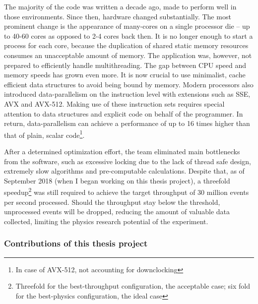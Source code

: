 \documentclass[12pt]{article}
\begin{document}
\vspace{1pc}
The majority of the code was written a decade ago, made to perform well in those environments. Since then, hardware changed substantially. The most prominent change is the appearance of many-cores on a single processor die -- up to 40-60 cores as opposed to 2-4 cores back then. It is no longer enough to start a process for each core, because the duplication of shared static memory resources consumes an unacceptable amount of memory. The application was, however, not prepared to efficiently handle multithreading. The gap between CPU speed and memory speeds has grown even more. It is now crucial to use minimalist, cache efficient data structures to avoid being bound by memory. Modern processors also introduced data-parallelism on the instruction level with extensions such as SSE, AVX and AVX-512. Making use of these instruction sets requires special attention to data structures and explicit code on behalf of the programmer. In return, data-parallelism can achieve a performance of up to 16 times higher than that of plain, scalar code\footnote{In case of AVX-512, not accounting for downclocking}.

\vspace{1pc}
After a determined optimization effort, the team eliminated main bottlenecks from the software, such as excessive locking due to the lack of thread safe design, extremely slow algorithms and pre-computable calculations. Despite that, as of September 2018 (when I began working on this thesis project), a threefold speedup\footnote{Threefold for the best-throughput configuration, the acceptable case; six fold for the best-physics configuration, the ideal case} was still required to achieve the target throughput of 30 million events per second processed. Should the throughput stay below the threshold, unprocessed events will be dropped, reducing the amount of valuable data collected, limiting the physics research potential of the experiment.

\subsubsection{Contributions of this thesis project}
\end{document}
